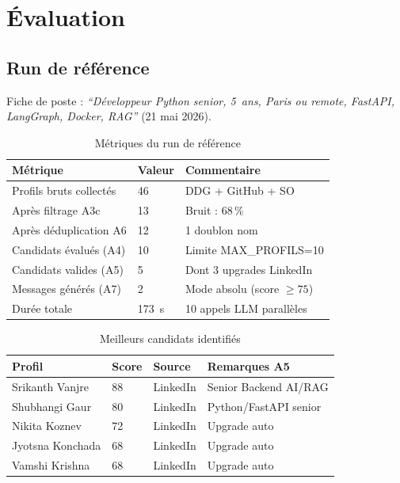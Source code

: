 \documentclass[12pt,a4paper]{report}
\begin{document}
\chapter{Évaluation}
\label{chap:eval}

\section{Run de référence}

Fiche de poste : \textit{``Développeur Python senior, 5~ans, Paris ou remote,
FastAPI, LangGraph, Docker, RAG''} (21 mai 2026).

\begin{table}[H]
\centering
\caption{Métriques du run de référence}
\label{tab:metriques_run}
\begin{tabularx}{\textwidth}{L{5.5cm}C{3cm}L{4.5cm}}
\toprule
\textbf{Métrique} & \textbf{Valeur} & \textbf{Commentaire} \\
\midrule
Profils bruts collectés & 46 & DDG + GitHub + SO \\
Après filtrage A3c & 13 & Bruit : 68\,\% \\
Après déduplication A6 & 12 & 1 doublon nom \\
Candidats évalués (A4) & 10 & Limite MAX\_PROFILS=10 \\
Candidats valides (A5) & 5 & Dont 3 upgrades LinkedIn \\
Messages générés (A7) & 2 & Mode absolu (score $\geq 75$) \\
Durée totale & 173~s & 10 appels LLM parallèles \\
\bottomrule
\end{tabularx}
\end{table}

\begin{table}[H]
\centering
\caption{Meilleurs candidats identifiés}
\label{tab:candidats}
\begin{tabularx}{\textwidth}{L{4.5cm}C{1.5cm}C{2cm}L{5cm}}
\toprule
\textbf{Profil} & \textbf{Score} & \textbf{Source} & \textbf{Remarques A5} \\
\midrule
Srikanth Vanjre & 88 & LinkedIn & Senior Backend AI/RAG \\
Shubhangi Gaur & 80 & LinkedIn & Python/FastAPI senior \\
Nikita Koznev & 72 & LinkedIn & Upgrade auto \\
Jyotsna Konchada & 68 & LinkedIn & Upgrade auto \\
Vamshi Krishna & 68 & LinkedIn & Upgrade auto \\
\bottomrule
\end{tabularx}
\end{table}
\end{document}
